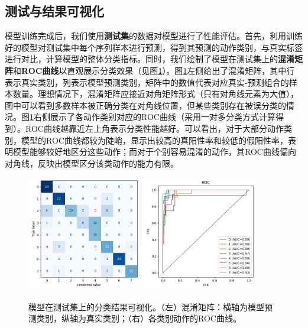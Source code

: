 \documentclass[UTF8]{article}
\begin{document}
\subsection{测试与结果可视化}

模型训练完成后，我们使用\textbf{测试集}的数据对模型进行了性能评估。首先，利用训练好的模型对测试集中每个序列样本进行预测，得到其预测的动作类别，与真实标签进行对比，计算模型的整体分类指标。同时，我们绘制了模型在测试集上的\textbf{混淆矩阵}和\textbf{ROC曲线}以直观展示分类效果（见图\ref{fig:results}）。图\ref{fig:results}左侧给出了混淆矩阵，其中行表示真实类别，列表示模型预测类别，矩阵中的数值代表对应真实-预测组合的样本数量。理想情况下，混淆矩阵应接近对角矩阵形式（只有对角线元素为大值），图中可以看到多数样本被正确分类在对角线位置，但某些类别存在被误分类的情况。图\ref{fig:results}右侧展示了各动作类别对应的ROC曲线（采用一对多分类方式计算得到）。ROC曲线越靠近左上角表示分类性能越好。可以看出，对于大部分动作类别，模型的ROC曲线都较为陡峭，显示出较高的真阳性率和较低的假阳性率，表明模型能够较好地区分这些动作；而对于个别容易混淆的动作，其ROC曲线偏向对角线，反映出模型区分该类动作的能力有限。

\begin{figure}[htbp]
    \centering
    \includegraphics[width=0.45\textwidth]{confusion_matrix.png}
    \quad
    \includegraphics[width=0.45\textwidth]{roc_curves.png}
    \caption{模型在测试集上的分类结果可视化。（左）混淆矩阵：横轴为模型预测类别，纵轴为真实类别；（右）各类别动作的ROC曲线。}
    \label{fig:results}
\end{figure}
\end{document}
